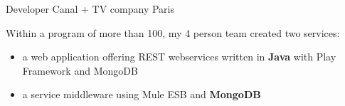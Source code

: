 \documentclass[11pt,a4paper]{moderncv}
\begin{document}
{Developer}
{Canal + }
{TV company}
{Paris}
{
Within a program of more than 100, my 4 person team created two services:
\begin{itemize}
\item a web application offering REST webservices written in \textbf{Java} with Play Framework and MongoDB
\item a service middleware using Mule ESB and \textbf{MongoDB}
\end{itemize}
}
\end{document}
